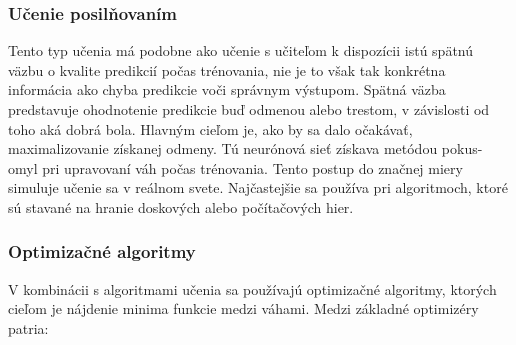 \subsubsection{Učenie posilňovaním}
Tento typ učenia má podobne ako učenie s učiteľom k dispozícii istú spätnú väzbu o kvalite predikcií počas trénovania, nie je to však tak konkrétna informácia ako chyba predikcie voči správnym výstupom. Spätná väzba predstavuje ohodnotenie predikcie buď odmenou alebo trestom, v závislosti od toho aká dobrá bola. Hlavným cieľom je, ako by sa dalo očakávať, maximalizovanie získanej odmeny. Tú neurónová sieť získava metódou pokus- omyl pri upravovaní váh počas trénovania. Tento postup do značnej miery simuluje učenie sa v reálnom svete. Najčastejšie sa používa pri algoritmoch, ktoré sú stavané na hranie doskových alebo počítačových hier. 


\subsubsection{Optimizačné algoritmy}
V kombinácii s algoritmami učenia sa používajú optimizačné algoritmy, ktorých cieľom je nájdenie minima funkcie medzi váhami. Medzi základné optimizéry patria:

